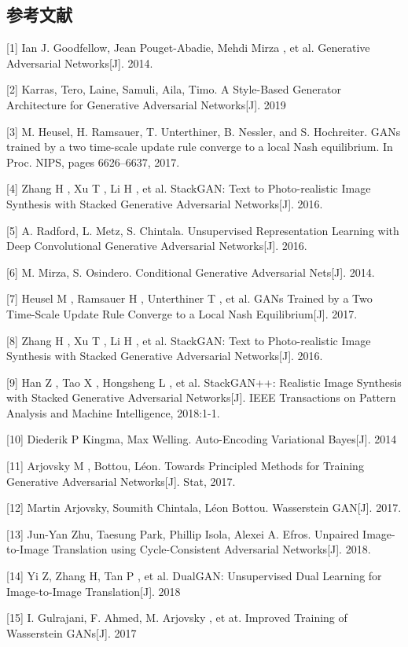 \documentclass{article}
\begin{document}
\begin{CJK*}{UTF8}{gbsn}
\section*{参考文献}

\small

[1] Ian J. Goodfellow, Jean Pouget-Abadie, Mehdi Mirza , et al. Generative Adversarial Networks[J]. 2014.

[2] Karras, Tero, Laine, Samuli, Aila, Timo. A Style-Based Generator Architecture for Generative Adversarial Networks[J]. 2019

[3] M. Heusel, H. Ramsauer, T. Unterthiner, B. Nessler, and S. Hochreiter. GANs trained by a two time-scale update rule converge to a local Nash equilibrium. In Proc. NIPS, pages 6626–6637, 2017.

[4] Zhang H , Xu T , Li H , et al. StackGAN: Text to Photo-realistic Image Synthesis with Stacked Generative Adversarial Networks[J]. 2016.

[5] A. Radford, L. Metz, S. Chintala. Unsupervised Representation Learning with Deep Convolutional Generative Adversarial Networks[J]. 2016.

[6] M. Mirza, S. Osindero. Conditional Generative Adversarial Nets[J]. 2014.

[7] Heusel M , Ramsauer H , Unterthiner T , et al. GANs Trained by a Two Time-Scale Update Rule Converge to a Local Nash Equilibrium[J]. 2017.

[8] Zhang H , Xu T , Li H , et al. StackGAN: Text to Photo-realistic Image Synthesis with Stacked Generative Adversarial Networks[J]. 2016.

[9] Han Z , Tao X , Hongsheng L , et al. StackGAN++: Realistic Image Synthesis with Stacked Generative Adversarial Networks[J]. IEEE Transactions on Pattern Analysis and Machine Intelligence, 2018:1-1.

[10] Diederik P Kingma, Max Welling. Auto-Encoding Variational Bayes[J]. 2014

[11] Arjovsky M , Bottou, L\'{e}on. Towards Principled Methods for Training Generative Adversarial Networks[J]. Stat, 2017.

[12] Martin Arjovsky, Soumith Chintala, L\'{e}on Bottou. Wasserstein GAN[J]. 2017.

[13] Jun-Yan Zhu, Taesung Park, Phillip Isola, Alexei A. Efros. Unpaired Image-to-Image Translation using Cycle-Consistent Adversarial Networks[J]. 2018.

[14] Yi Z, Zhang H, Tan P , et al. DualGAN: Unsupervised Dual Learning for Image-to-Image Translation[J]. 2018

[15] I. Gulrajani, F. Ahmed, M. Arjovsky , et at. Improved Training of Wasserstein GANs[J]. 2017

\end{CJK*}
\end{document}
